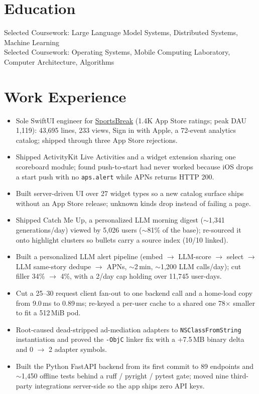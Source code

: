 \documentclass[11pt, letterpaper]{article}
\begin{document}

\section{Education}
Selected Coursework: Large Language Model Systems, Distributed Systems, Machine Learning\\[1pt]
Selected Coursework: Operating Systems, Mobile Computing Laboratory, Computer Architecture, Algorithms

\section{Work Experience}
\begin{itemize}
  \item Sole SwiftUI engineer for \href{https://apps.apple.com/app/id6762649287}{SportsBreak} (1.4K App Store ratings; peak DAU 1{,}119): 43{,}695 lines, 233 views, Sign in with Apple, a 72-event analytics catalog; shipped through three App Store rejections.
  \item Shipped ActivityKit Live Activities and a widget extension sharing one scoreboard module; found push-to-start had never worked because iOS drops a start push with no \texttt{aps.alert} while APNs returns HTTP 200.
  \item Built server-driven UI over 27 widget types so a new catalog surface ships without an App Store release; unknown kinds drop instead of failing a page.
  \item Shipped Catch Me Up, a personalized LLM morning digest ($\sim$1{,}341 generations/day) viewed by 5{,}026 users ($\sim$81\% of the base); re-sourced it onto highlight clusters so bullets carry a source index (10/10 linked).
  \item Built a personalized LLM alert pipeline (embed $\to$ LLM-score $\to$ select $\to$ LLM same-story dedupe $\to$ APNs, $\sim$2\,min, $\sim$1{,}200 LLM calls/day); cut filler 34\% $\to$ 4\%, with a 2/day cap holding over 11{,}745 user-days.
  \item Cut a 25--30 request client fan-out to one backend call and a home-load copy from 9.0\,ms to 0.89\,ms; re-keyed a per-user cache to a shared one 78$\times$ smaller to fit a 512\,MiB pod.
  \item Root-caused dead-stripped ad-mediation adapters to \texttt{NSClassFromString} instantiation and proved the \texttt{-ObjC} linker fix with a +7.5\,MB binary delta and 0 $\to$ 2 adapter symbols.
  \item Built the Python FastAPI backend from its first commit to 89 endpoints and $\sim$1{,}450 offline tests behind a ruff / pyright / pytest gate; moved nine third-party integrations server-side so the app ships zero API keys.
\end{itemize}
\end{document}
